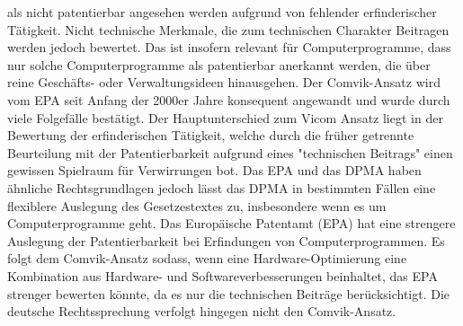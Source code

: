 als nicht patentierbar angesehen werden aufgrund von fehlender
erfinderischer Tätigkeit. Nicht technische Merkmale,
die zum technischen Charakter Beitragen werden jedoch bewertet.
Das ist insofern relevant für Computerprogramme,
dass nur solche Computerprogramme als patentierbar anerkannt werden, 
die über reine Geschäfts- oder Verwaltungsideen hinausgehen.
Der Comvik-Ansatz wird vom EPA seit Anfang der 2000er Jahre 
konsequent angewandt und 
wurde durch viele Folgefälle bestätigt.
Der Hauptunterschied zum Vicom Ansatz liegt in der
Bewertung der erfinderischen Tätigkeit, welche durch
die früher getrennte Beurteilung mit 
der Patentierbarkeit aufgrund eines "technischen Beitrags"
einen gewissen Spielraum für Verwirrungen bot.
Das EPA und das DPMA haben ähnliche Rechtsgrundlagen
jedoch lässt das DPMA in bestimmten Fällen 
eine flexiblere Auslegung des Gesetzestextes zu, 
insbesondere wenn es um Computerprogramme geht.
Das Europäische Patentamt (EPA) hat eine strengere Auslegung der Patentierbarkeit 
bei Erfindungen von Computerprogrammen. Es folgt dem Comvik-Ansatz
sodass,
wenn eine Hardware-Optimierung eine 
Kombination aus Hardware- und Softwareverbesserungen beinhaltet, das 
EPA strenger bewerten könnte, da es nur die technischen Beiträge berücksichtigt.
Die deutsche Rechtssprechung verfolgt hingegen nicht den Comvik-Ansatz.

